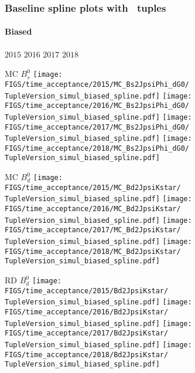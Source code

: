 \begin{frame} %
\frametitle{Baseline spline plots with \TupleVersion\, tuples}
\framesubtitle{Biased}

  \phantom{2020} \hspace*{1.5cm} $2015$ \hspace*{1.5cm} $2016$ \hspace*{1.5cm} $2017$ \hspace*{1.5cm} $2018$

  MC $B_s^0$
  \texttt{[image: \\FIGS/time\_acceptance/2015/MC\_Bs2JpsiPhi\_dG0/\\TupleVersion\_simul\_biased\_spline.pdf]}
  \texttt{[image: \\FIGS/time\_acceptance/2016/MC\_Bs2JpsiPhi\_dG0/\\TupleVersion\_simul\_biased\_spline.pdf]}
  \texttt{[image: \\FIGS/time\_acceptance/2017/MC\_Bs2JpsiPhi\_dG0/\\TupleVersion\_simul\_biased\_spline.pdf]}
  \texttt{[image: \\FIGS/time\_acceptance/2018/MC\_Bs2JpsiPhi\_dG0/\\TupleVersion\_simul\_biased\_spline.pdf]}
  \vspace*{2mm}

  MC $B_d^0$
  \texttt{[image: \\FIGS/time\_acceptance/2015/MC\_Bd2JpsiKstar/\\TupleVersion\_simul\_biased\_spline.pdf]}
  \texttt{[image: \\FIGS/time\_acceptance/2016/MC\_Bd2JpsiKstar/\\TupleVersion\_simul\_biased\_spline.pdf]}
  \texttt{[image: \\FIGS/time\_acceptance/2017/MC\_Bd2JpsiKstar/\\TupleVersion\_simul\_biased\_spline.pdf]}
  \texttt{[image: \\FIGS/time\_acceptance/2018/MC\_Bd2JpsiKstar/\\TupleVersion\_simul\_biased\_spline.pdf]}
  \vspace*{2mm}

  RD $B_d^0$
  \texttt{[image: \\FIGS/time\_acceptance/2015/Bd2JpsiKstar/\\TupleVersion\_simul\_biased\_spline.pdf]}
  \texttt{[image: \\FIGS/time\_acceptance/2016/Bd2JpsiKstar/\\TupleVersion\_simul\_biased\_spline.pdf]}
  \texttt{[image: \\FIGS/time\_acceptance/2017/Bd2JpsiKstar/\\TupleVersion\_simul\_biased\_spline.pdf]}
  \texttt{[image: \\FIGS/time\_acceptance/2018/Bd2JpsiKstar/\\TupleVersion\_simul\_biased\_spline.pdf]}

\end{frame} %



